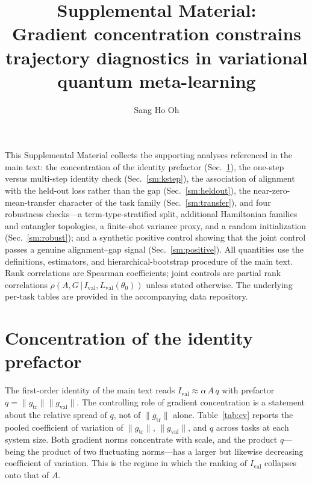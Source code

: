 \documentclass[aps,pra,onecolumn,superscriptaddress,10pt]{revtex4-2}
\newcommand{\Ival}{I_{\mathrm{val}}}
\newcommand{\thetaz}{\theta_0}
\newcommand{\Lval}{L_{\mathrm{val}}}
\newcommand{\gtr}{g_{\mathrm{tr}}}
\newcommand{\gval}{g_{\mathrm{val}}}
\begin{document}
\title{Supplemental Material:\\
Gradient concentration constrains trajectory diagnostics
in variational quantum meta-learning}

\author{Sang Ho Oh}

\maketitle

This Supplemental Material collects the supporting analyses referenced in the main text: the
concentration of the identity prefactor (Sec.~\ref{sm:prefactor}), the one-step versus multi-step
identity check (Sec.~\ref{sm:kstep}), the association of alignment with the held-out loss rather than
the gap (Sec.~\ref{sm:heldout}), the near-zero-mean-transfer character of the task family
(Sec.~\ref{sm:transfer}), and four robustness checks---a term-type-stratified split, additional
Hamiltonian families and entangler topologies, a finite-shot variance proxy, and a random
initialization (Sec.~\ref{sm:robust}); and a synthetic positive control showing that the joint
control passes a genuine alignment--gap signal (Sec.~\ref{sm:positive}). All quantities use the definitions, estimators, and
hierarchical-bootstrap procedure of the main text. Rank correlations are Spearman coefficients; joint
controls are partial rank correlations $\rho(A,G\,|\,\Ival,\Lval(\thetaz))$ unless stated otherwise.
The underlying per-task tables are provided in the accompanying data repository.

\section{Concentration of the identity prefactor}
\label{sm:prefactor}

The first-order identity of the main text reads $\Ival\approx\alpha\,A\,q$ with prefactor
$q=\|\gtr\|\|\gval\|$. The controlling role of gradient concentration is a statement about the
relative spread of $q$, not of $\|\gtr\|$ alone. Table~\ref{tab:cv} reports the pooled coefficient of
variation of $\|\gtr\|$, $\|\gval\|$, and $q$ across tasks at each system size. Both gradient norms
concentrate with scale, and the product $q$---being the product of two fluctuating norms---has a
larger but likewise decreasing coefficient of variation. This is the regime in which the ranking of
$\Ival$ collapses onto that of $A$.
\end{document}

